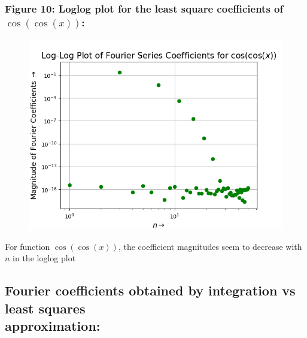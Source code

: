 \documentclass[12pt, a4paper]{article}
\begin{document}
\subsubsection{Figure 10: Loglog plot for the least square coefficients of $\cos(\cos(x))$:}
\vspace*{-0.5cm}
\begin{figure}[H]
    \centering
    \includegraphics[scale = 0.75]{Figure_10.png}
    \label{fig:sample}
\end{figure}
\vspace*{-0.5cm}
\begin{center}
    For function $\cos(\cos(x))$, the coefficient magnitudes seem to decrease with $n$ in the loglog plot
\end{center}

\subsection{Fourier coefficients obtained by integration vs least squares \\ approximation:}
\end{document}
